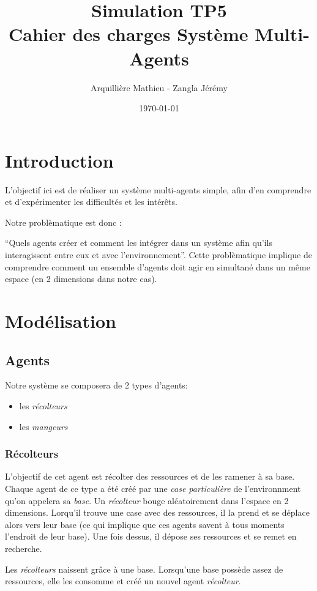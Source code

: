 \documentclass{article}
\title{Simulation TP5\\Cahier des charges Système Multi-Agents}
\author{Arquillière Mathieu - Zangla Jérémy}
\date{\today}
\begin{document}
\begin{titlepage}
  \maketitle
\end{titlepage}

\tableofcontents
\listoffigures
\newpage

\section{Introduction}
L'objectif ici est de réaliser un système multi-agents simple, afin d'en
comprendre et d'expérimenter les difficultés et les intérêts.

Notre problèmatique est donc :

\enquote{Quels agents créer et comment les intégrer dans un système afin
qu'ils interagissent entre eux et avec l'environnement}.
Cette problèmatique implique de comprendre comment un ensemble d'agents doit agir
en simultané dans un même espace (en 2 dimensions dans notre cas).

\section{Modélisation}
\subsection{Agents}
Notre système se composera de 2 types d'agents:
\begin{itemize}
  \item les \emph{récolteurs}
  \item les \emph{mangeurs}
\end{itemize}

\subsubsection{Récolteurs}
L'objectif de cet agent est récolter des ressources et de les ramener à sa base. Chaque
agent de ce type a été créé par une \emph{case particulière} de l'environnment qu'on
appelera sa \emph{base}. Un \emph{récolteur} bouge aléatoirement dans l'espace
en 2 dimensions. Lorqu'il trouve une case avec des ressources, il la prend et se déplace
alors vers leur base (ce qui implique que ces agents savent à tous moments l'endroit de
leur base). Une fois dessus, il dépose ses ressources et se remet en recherche.

Les \emph{récolteurs} naissent grâce à une base. Lorsqu'une base possède assez de ressources,
elle les consomme et créé un nouvel agent \emph{récolteur}.
\end{document}
